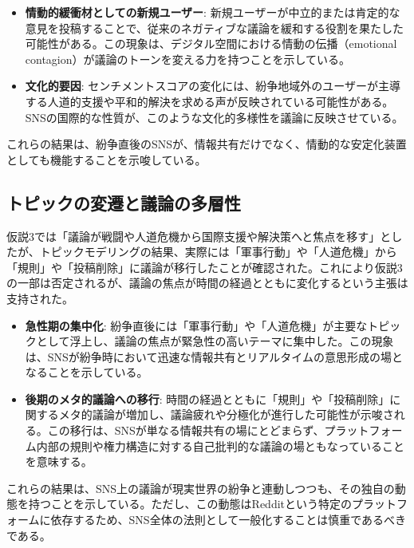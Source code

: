 \documentclass[11pt, a4j]{jreport}
\begin{document}
    \begin{itemize}
        \item \textbf{情動的緩衝材としての新規ユーザー}: 新規ユーザーが中立的または肯定的な意見を投稿することで、従来のネガティブな議論を緩和する役割を果たした可能性がある。この現象は、デジタル空間における情動の伝播（emotional contagion）\cite{kleinberg2020emotion}が議論のトーンを変える力を持つことを示している。
        \item \textbf{文化的要因}: センチメントスコアの変化には、紛争地域外のユーザーが主導する人道的支援や平和的解決を求める声が反映されている可能性がある。SNSの国際的な性質が、このような文化的多様性を議論に反映させている。
    \end{itemize}

    これらの結果は、紛争直後のSNSが、情報共有だけでなく、情動的な安定化装置としても機能することを示唆している。

    \subsection{トピックの変遷と議論の多層性}
    仮説3では「議論が戦闘や人道危機から国際支援や解決策へと焦点を移す」としたが、トピックモデリングの結果、実際には「軍事行動」や「人道危機」から「規則」や「投稿削除」に議論が移行したことが確認された。これにより仮説3の一部は否定されるが、議論の焦点が時間の経過とともに変化するという主張は支持された。

    \begin{itemize}
        \item \textbf{急性期の集中化}: 紛争直後には「軍事行動」や「人道危機」が主要なトピックとして浮上し、議論の焦点が緊急性の高いテーマに集中した。この現象は、SNSが紛争時において迅速な情報共有とリアルタイムの意思形成の場となることを示している。
        \item \textbf{後期のメタ的議論への移行}: 時間の経過とともに「規則」や「投稿削除」に関するメタ的議論が増加し、議論疲れ\cite{sunstein2001republic}や分極化が進行した可能性が示唆される。この移行は、SNSが単なる情報共有の場にとどまらず、プラットフォーム内部の規則や権力構造に対する自己批判的な議論の場ともなっていることを意味する。
    \end{itemize}

    これらの結果は、SNS上の議論が現実世界の紛争と連動しつつも、その独自の動態を持つことを示している。ただし、この動態はRedditという特定のプラットフォームに依存するため、SNS全体の法則として一般化することは慎重であるべきである。
\end{document}
